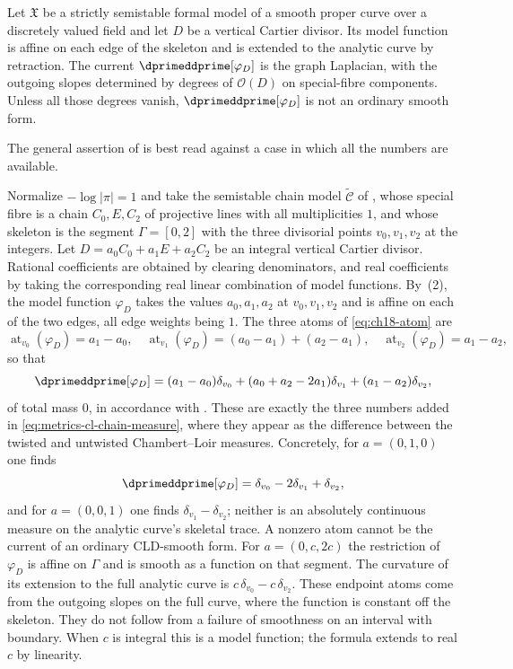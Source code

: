 \begin{example}
\label{ex:ch18-model-function-defect}
Let $\mathfrak X$ be a strictly semistable formal model of a smooth proper
curve over a discretely valued field and let $D$ be a vertical Cartier
divisor.  Its model function is affine on each edge of the skeleton and is
extended to the analytic curve by retraction.
The current $\dprimeddprime[\varphi_D]$ is the graph Laplacian, with the outgoing
slopes determined by degrees of $\mathcal O(D)$ on special-fibre
components.  Unless all those degrees vanish, $\dprimeddprime[\varphi_D]$ is not an
ordinary smooth form.
\end{example}

The general assertion of  is best read
against a case in which all the numbers are available.

\begin{example}
\label{ex:ch18-chain-numbers}
Normalize $-\log|\pi|=1$ and take the semistable chain model
$\widetilde{\mathcal C}$ of
, whose special fibre is a chain
$C_0,E,C_2$ of projective lines with all multiplicities $1$, and whose
skeleton is the segment $\Gamma=[0,2]$ with the three divisorial points
$v_0,v_1,v_2$ at the integers.  Let $D=a_0C_0+a_1E+a_2C_2$ be an integral
vertical Cartier divisor.  Rational coefficients are obtained by clearing
denominators, and real coefficients by taking the corresponding real linear
combination of model functions.  By
\,(2), the model function
$\varphi_D$ takes the values $a_0,a_1,a_2$ at $v_0,v_1,v_2$ and is affine on
each of the two edges, all edge weights being $1$.  The three atoms of
\eqref{eq:ch18-atom} are
\begin{equation}
\label{eq:ch18-chain-atoms}
 \operatorname{at}_{v_0}(\varphi_D)=a_1-a_0,\quad
 \operatorname{at}_{v_1}(\varphi_D)=(a_0-a_1)+(a_2-a_1),\quad
 \operatorname{at}_{v_2}(\varphi_D)=a_1-a_2,
\end{equation}
so that
\[
 \dprimeddprime[\varphi_D]
 =(a_1-a_0)\delta_{v_0}
 +(a_0+a_2-2a_1)\delta_{v_1}
 +(a_1-a_2)\delta_{v_2},
\]
of total mass $0$, in accordance with .  These are
exactly the three numbers added in \eqref{eq:metrics-cl-chain-measure},
where they appear as the difference between the twisted and untwisted
Chambert--Loir measures.  Concretely, for $a=(0,1,0)$ one finds
\[
 \dprimeddprime[\varphi_D]=\delta_{v_0}-2\delta_{v_1}+\delta_{v_2},
\]
and for $a=(0,0,1)$ one finds $\delta_{v_1}-\delta_{v_2}$; neither is an
absolutely continuous measure on the analytic curve's skeletal trace.
A nonzero atom cannot be the current of an ordinary CLD-smooth form.
For $a=(0,c,2c)$ the restriction of $\varphi_D$ is affine on $\Gamma$ and
is smooth as a function on that segment.  The curvature of its extension
to the full analytic curve is
$c\,\delta_{v_0}-c\,\delta_{v_2}$.  These endpoint atoms come from the
outgoing slopes on the full curve, where the function is constant off the
skeleton.  They do not follow from a failure of smoothness on an interval
with boundary.  When $c$ is integral this is a model function; the formula
extends to real $c$ by linearity.
\end{example}

